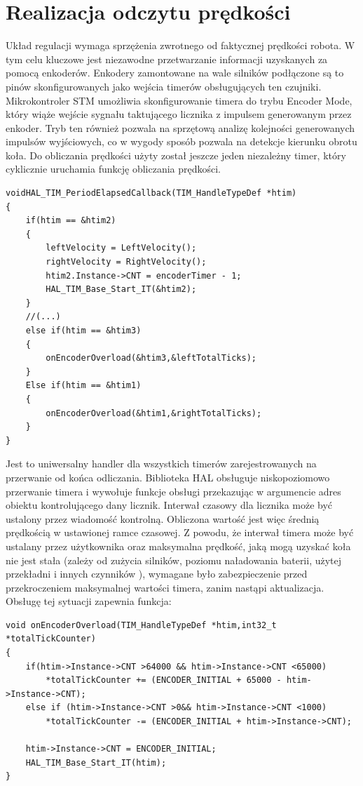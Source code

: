 \documentclass[eng,printmode]{mgr}
\begin{document}
 \section{Realizacja odczytu prędkości}

Układ regulacji wymaga sprzężenia zwrotnego od faktycznej prędkości robota. W tym celu kluczowe jest niezawodne przetwarzanie informacji uzyskanych za pomocą enkoderów. Enkodery zamontowane na wale silników podłączone są to pinów skonfigurowanych jako wejścia timerów obsługujących ten czujniki. Mikrokontroler STM umożliwia skonfigurowanie timera do trybu Encoder Mode, który wiąże wejście sygnału taktującego licznika z impulsem generowanym przez enkoder. Tryb ten również pozwala na sprzętową analizę kolejności generowanych impulsów wyjściowych, co w wygody sposób pozwala na detekcje kierunku obrotu koła. Do obliczania prędkości użyty został jeszcze jeden niezależny timer, który cyklicznie uruchamia funkcję obliczania prędkości.
\begin{lstlisting}[style=c]
voidHAL_TIM_PeriodElapsedCallback(TIM_HandleTypeDef *htim)
{
	if(htim == &htim2)
	{
		leftVelocity = LeftVelocity();
		rightVelocity = RightVelocity();
		htim2.Instance->CNT = encoderTimer - 1;
		HAL_TIM_Base_Start_IT(&htim2);
	}
	//(...)
	else if(htim == &htim3)
	{
		onEncoderOverload(&htim3,&leftTotalTicks);
	}
	Else if(htim == &htim1)
	{
		onEncoderOverload(&htim1,&rightTotalTicks);
	}	
}

\end{lstlisting}
Jest to uniwersalny handler dla wszystkich timerów zarejestrowanych na przerwanie od końca odliczania. Biblioteka HAL obsługuje niskopoziomowo przerwanie timera i wywołuje funkcje obsługi przekazując w argumencie adres obiektu kontrolującego dany licznik. Interwał czasowy dla licznika może być ustalony przez wiadomość kontrolną. Obliczona wartość  jest więc średnią prędkością w ustawionej ramce czasowej.  Z powodu, że interwał timera może być ustalany przez użytkownika oraz maksymalna prędkość, jaką mogą uzyskać koła nie jest stała (zależy od zużycia silników, poziomu naładowania baterii, użytej przekładni i innych czynników ), wymagane było zabezpieczenie przed przekroczeniem maksymalnej wartości timera, zanim nastąpi aktualizacja. Obsługę tej sytuacji zapewnia funkcja:
\begin{lstlisting}[style=c]
void onEncoderOverload(TIM_HandleTypeDef *htim,int32_t *totalTickCounter)
{
	if(htim->Instance->CNT >64000 && htim->Instance->CNT <65000)
		*totalTickCounter += (ENCODER_INITIAL + 65000 - htim->Instance->CNT);
	else if (htim->Instance->CNT >0&& htim->Instance->CNT <1000)
		*totalTickCounter -= (ENCODER_INITIAL + htim->Instance->CNT);

	htim->Instance->CNT = ENCODER_INITIAL;
	HAL_TIM_Base_Start_IT(htim);
}

\end{lstlisting}
\end{document}
